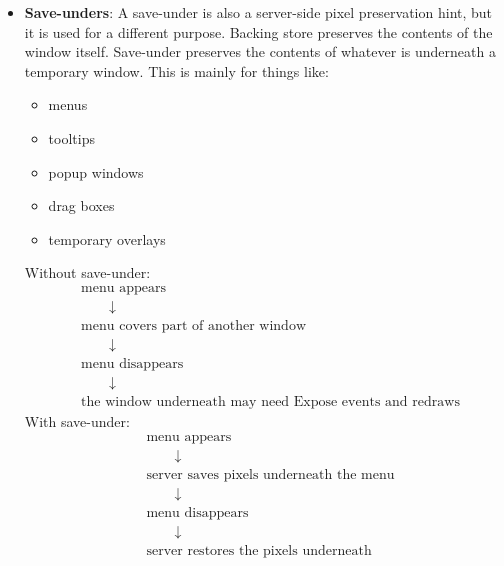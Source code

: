 \documentclass{report}
\begin{document}
\begin{itemize}
            \bigbreak \noindent 
            \textbf{Important:} backing store is only a hint. Your program must still handle Expose events correctly. The X server is allowed not to preserve the contents, especially if it decides the backing store would be too expensive.
        \item \textbf{Save-unders}: A save-under is also a server-side pixel preservation hint, but it is used for a different purpose.
            \bigbreak \noindent 
            Backing store preserves the contents of the window itself.
            \bigbreak \noindent 
            Save-under preserves the contents of whatever is underneath a temporary window.
            \bigbreak \noindent 
            This is mainly for things like:
            \begin{itemize}
                \item menus
                \item tooltips
                \item popup windows
                \item drag boxes
                \item temporary overlays
            \end{itemize}
            Without save-under:
            \begin{align*}
                &\text{menu appears} \\
                &\qquad\downarrow \\
                &\text{menu covers part of another window} \\
                &\qquad\downarrow \\
                &\text{menu disappears} \\
                &\qquad\downarrow \\
                &\text{the window underneath may need Expose events and redraws}
            \end{align*}
            With save-under:
            \begin{align*}
                &\text{menu appears} \\
                &\qquad\downarrow\\
                &\text{server saves pixels underneath the menu} \\
                &\qquad\downarrow \\
                &\text{menu disappears} \\
                &\qquad\downarrow \\
                &\text{server restores the pixels underneath} \\

\end{align*}
\end{itemize}
\end{document}

